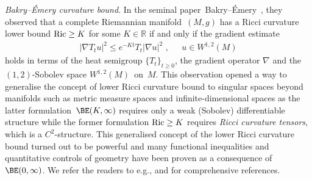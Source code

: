 \documentclass[11pt,letterpaper]{amsart}
\newcommand{\R}{{\mathbb R}}
\newcommand{\comma}{\,\,\mathrm{,}\;\,}
\renewcommand{\1}{\mathbf 1}
\numberwithin{equation}{section}
\theoremstyle{plain}
\theoremstyle{definition}
\theoremstyle{remark}
\renewcommand{\paragraph}[1]{\medskip\emph{#1}.\quad}
\begin{document}
 \smallskip
\paragraph{Bakry--\'Emery curvature bound}%
In the seminal paper~Bakry--\'Emery~\cite{BakEme84}, they observed that a complete Riemannian manifold~$(M, g)$ has a Ricci curvature lower bound ${\rm Ric} \ge K$ for some $K \in \R$ if and only if the gradient estimate 
\begin{align}\label{D:BE}|\nabla T_tu|^2 \le e^{-Kt}T_t|\nabla u|^2 \tag{$\BE(K,\infty)$} \comma \quad u \in W^{1,2}(M)
\end{align}
 holds in terms of the heat semigroup $\{T_t\}_{t \ge 0}$, the gradient operator $\nabla$ and the $(1,2)$-Sobolev space $W^{1,2}(M)$~on~$M$. This observation opened a way to generalise the concept of lower Ricci curvature bound to singular spaces beyond manifolds such as metric measure spaces and infinite-dimensional spaces as the latter formulation~$\BE(K,\infty)$ requires only a weak (Sobolev) differentiable structure while the former formulation ${\rm Ric} \ge K$ requires {\it Ricci curvature tensors}, which is a $C^2$-structure. This generalised concept of the lower Ricci curvature bound turned out to be powerful and many functional inequalities and quantitative controls of geometry have been proven as a consequence of $\BE(0,\infty)$.
 We refer the readers to e.g., \cite{BakGenLed14} and \cite{Vil09} for  comprehensive references. 
\end{document}
